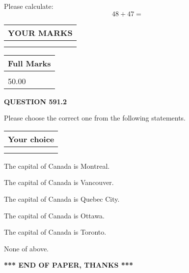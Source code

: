 \documentclass[12pt]{article}
\begin{document}
  
 
Please calculate:
\begin{equation}
48 +  %
47 = \nonumber
\end{equation}
 

 

 
  
\vspace{0.2in}
  
\noindent\begin{tabular}{|l|}
\hline
 YOUR MARKS  \\
\hline
 \\ 
 \\ 
\hline
\end{tabular}
\hspace{0.05in} \begin{tabular}{|l|}
\hline
 Full Marks  \\
\hline
 \\ 
50.00 \\
\hline
\end{tabular}
{\textbf{\Large{QUESTION
591.2 
}}}
  
  
Please choose the correct one from the following statements.
  
  
\noindent\hspace{3.0in} \begin{tabular}{|l|}
\hline
Your choice \\
\hline
 \\ 
 \\ 
\hline
\end{tabular}
  
  
 
 
The capital of Canada is Montreal.
 
 
The capital of Canada is Vancouver.
 
 
The capital of Canada is Quebec City.
 
 
The capital of Canada is Ottawa.
 
 
The capital of Canada is Toronto.
 
 
 None of above.
 
 
   
   
 \vspace{0.2in}
 
   
   
   
   
\vspace{1.0in} 
{\textbf{\large{ *** END OF PAPER, THANKS *** }}} 
   
\end{document}
